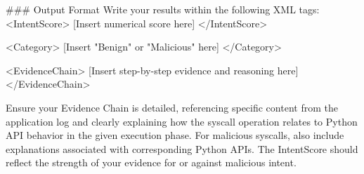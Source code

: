 \begin{tcblisting}
### Output Format
Write your results within the following XML tags:
<IntentScore>
[Insert numerical score here]
</IntentScore>

<Category>
[Insert "Benign" or "Malicious" here]
</Category>

<EvidenceChain>
[Insert step-by-step evidence and reasoning here]
</EvidenceChain>

Ensure your Evidence Chain is detailed, referencing specific content from the application log and clearly explaining how the syscall operation relates to Python API behavior in the given execution phase. For malicious syscalls, also include explanations associated with corresponding Python APIs. The IntentScore should reflect the strength of your evidence for or against malicious intent.
\end{tcblisting}